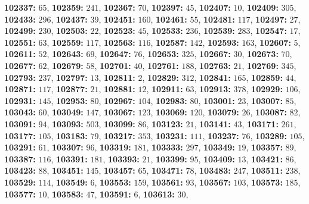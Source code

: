 \textsf{\bfseries 102337:} $65$, \textsf{\bfseries 102359:} $241$, \textsf{\bfseries 102367:} $70$, \textsf{\bfseries 102397:} $45$, \textsf{\bfseries 102407:} $10$, \textsf{\bfseries 102409:} $305$, \textsf{\bfseries 102433:} $296$, \textsf{\bfseries 102437:} $39$, \textsf{\bfseries 102451:} $160$, \textsf{\bfseries 102461:} $55$, \textsf{\bfseries 102481:} $117$, \textsf{\bfseries 102497:} $27$, \textsf{\bfseries 102499:} $230$, \textsf{\bfseries 102503:} $22$, \textsf{\bfseries 102523:} $45$, \textsf{\bfseries 102533:} $236$, \textsf{\bfseries 102539:} $283$, \textsf{\bfseries 102547:} $17$, \textsf{\bfseries 102551:} $63$, \textsf{\bfseries 102559:} $117$, \textsf{\bfseries 102563:} $116$, \textsf{\bfseries 102587:} $142$, \textsf{\bfseries 102593:} $163$, \textsf{\bfseries 102607:} $5$, \textsf{\bfseries 102611:} $52$, \textsf{\bfseries 102643:} $69$, \textsf{\bfseries 102647:} $76$, \textsf{\bfseries 102653:} $325$, \textsf{\bfseries 102667:} $30$, \textsf{\bfseries 102673:} $70$, \textsf{\bfseries 102677:} $62$, \textsf{\bfseries 102679:} $58$, \textsf{\bfseries 102701:} $40$, \textsf{\bfseries 102761:} $188$, \textsf{\bfseries 102763:} $21$, \textsf{\bfseries 102769:} $345$, \textsf{\bfseries 102793:} $237$, \textsf{\bfseries 102797:} $13$, \textsf{\bfseries 102811:} $2$, \textsf{\bfseries 102829:} $312$, \textsf{\bfseries 102841:} $165$, \textsf{\bfseries 102859:} $44$, \textsf{\bfseries 102871:} $117$, \textsf{\bfseries 102877:} $21$, \textsf{\bfseries 102881:} $12$, \textsf{\bfseries 102911:} $63$, \textsf{\bfseries 102913:} $378$, \textsf{\bfseries 102929:} $106$, \textsf{\bfseries 102931:} $145$, \textsf{\bfseries 102953:} $80$, \textsf{\bfseries 102967:} $104$, \textsf{\bfseries 102983:} $80$, \textsf{\bfseries 103001:} $23$, \textsf{\bfseries 103007:} $85$, \textsf{\bfseries 103043:} $60$, \textsf{\bfseries 103049:} $147$, \textsf{\bfseries 103067:} $123$, \textsf{\bfseries 103069:} $120$, \textsf{\bfseries 103079:} $26$, \textsf{\bfseries 103087:} $82$, \textsf{\bfseries 103091:} $94$, \textsf{\bfseries 103093:} $503$, \textsf{\bfseries 103099:} $86$, \textsf{\bfseries 103123:} $21$, \textsf{\bfseries 103141:} $43$, \textsf{\bfseries 103171:} $261$, \textsf{\bfseries 103177:} $105$, \textsf{\bfseries 103183:} $79$, \textsf{\bfseries 103217:} $353$, \textsf{\bfseries 103231:} $111$, \textsf{\bfseries 103237:} $76$, \textsf{\bfseries 103289:} $105$, \textsf{\bfseries 103291:} $61$, \textsf{\bfseries 103307:} $96$, \textsf{\bfseries 103319:} $181$, \textsf{\bfseries 103333:} $297$, \textsf{\bfseries 103349:} $19$, \textsf{\bfseries 103357:} $89$, \textsf{\bfseries 103387:} $116$, \textsf{\bfseries 103391:} $181$, \textsf{\bfseries 103393:} $21$, \textsf{\bfseries 103399:} $95$, \textsf{\bfseries 103409:} $13$, \textsf{\bfseries 103421:} $86$, \textsf{\bfseries 103423:} $88$, \textsf{\bfseries 103451:} $145$, \textsf{\bfseries 103457:} $65$, \textsf{\bfseries 103471:} $78$, \textsf{\bfseries 103483:} $247$, \textsf{\bfseries 103511:} $238$, \textsf{\bfseries 103529:} $114$, \textsf{\bfseries 103549:} $6$, \textsf{\bfseries 103553:} $159$, \textsf{\bfseries 103561:} $93$, \textsf{\bfseries 103567:} $103$, \textsf{\bfseries 103573:} $185$, \textsf{\bfseries 103577:} $10$, \textsf{\bfseries 103583:} $47$, \textsf{\bfseries 103591:} $6$, \textsf{\bfseries 103613:} $30$, 
